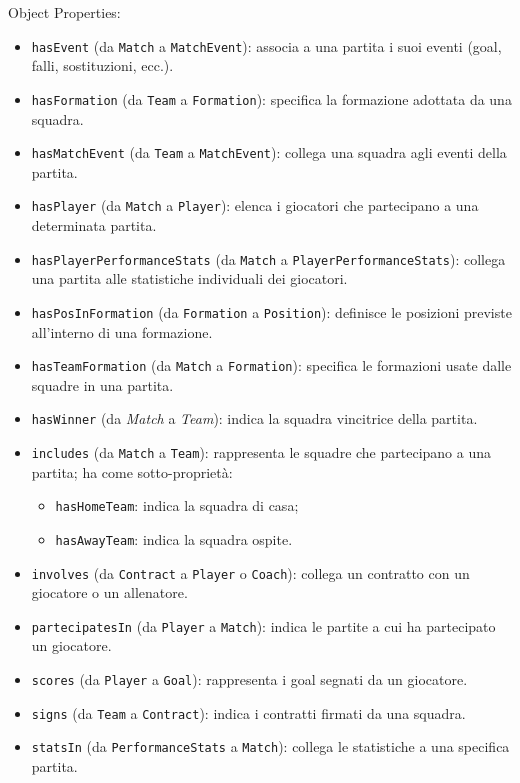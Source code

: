 \documentclass[11pt]{report} %
\begin{document}
Object Properties:
\begin{itemize}
    \item \texttt{hasEvent} (da \texttt{Match} a \texttt{MatchEvent}): associa a una partita i suoi eventi (goal, falli, sostituzioni, ecc.).
    \item \texttt{hasFormation} (da \texttt{Team} a \texttt{Formation}): specifica la formazione adottata da una squadra.
    \item \texttt{hasMatchEvent} (da \texttt{Team} a \texttt{MatchEvent}): collega una squadra agli eventi della partita.
    \item \texttt{hasPlayer} (da \texttt{Match} a \texttt{Player}): elenca i giocatori che partecipano a una determinata partita.
    \item \texttt{hasPlayerPerformanceStats} (da \texttt{Match} a \texttt{PlayerPerformanceStats}): collega una partita alle statistiche individuali dei giocatori.
    \item \texttt{hasPosInFormation} (da \texttt{Formation} a \texttt{Position}): definisce le posizioni previste all'interno di una formazione.
    \item \texttt{hasTeamFormation} (da \texttt{Match} a \texttt{Formation}): specifica le formazioni usate dalle squadre in una partita.
    \item \texttt{hasWinner} (da \textit{Match} a \textit{Team}): indica la squadra vincitrice della partita.
    \item \texttt{includes} (da \texttt{Match} a \texttt{Team}): rappresenta le squadre che partecipano a una partita; ha come sotto-proprietà:
    
    \begin{itemize}
        \item \texttt{hasHomeTeam}: indica la squadra di casa;
        \item \texttt{hasAwayTeam}: indica la squadra ospite.
    \end{itemize}

    \item \texttt{involves} (da \texttt{Contract} a \texttt{Player} o \texttt{Coach}): collega un contratto con un giocatore o un allenatore.
    \item \texttt{partecipatesIn} (da \texttt{Player} a \texttt{Match}): indica le partite a cui ha partecipato un giocatore.
    \item \texttt{scores} (da \texttt{Player} a \texttt{Goal}): rappresenta i goal segnati da un giocatore.
    \item \texttt{signs} (da \texttt{Team} a \texttt{Contract}): indica i contratti firmati da una squadra.
    \item \texttt{statsIn} (da \texttt{PerformanceStats} a \texttt{Match}): collega le statistiche a una specifica partita.
\end{itemize}
\end{document}
